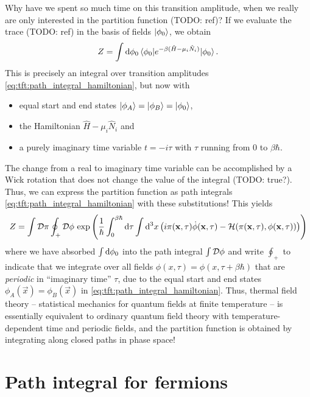 Why have we spent so much time on this transition amplitude, when we really are only interested in the partition function (TODO: ref)?
If we evaluate the trace (TODO: ref) in the basis of fields $\ket{\phi_0}$, we obtain
\begin{equation}
	Z = \int \mathop{}\!\mathrm{d} \phi_0 \braket{\phi_0 | e^{-\beta (\hat{H} - \mu_i \hat{N}_i)} | \phi_0} .
\end{equation}
This is precisely an integral over transition amplitudes \eqref{eq:tft:path_integral_hamiltonian}, but now with 
\begin{itemize}
\item equal start and end states $\ket{\phi_A} = \ket{\phi_B} = \ket{\phi_0}$, 
\item the Hamiltonian $\hat{H} - \mu_i \hat{N}_i$ and 
\item a purely imaginary time variable $t = -i \tau$ with $\tau$ running from $0$ to $\beta \hbar$.
\end{itemize}
The change from a real to imaginary time variable can be accomplished by a Wick rotation that does not change the value of the integral (TODO: true?).
Thus, we can express the partition function as path integrals \eqref{eq:tft:path_integral_hamiltonian} with these substitutions!
This yields
\begin{equation}
	Z = \int \mathcal{D} \pi \oint_+ \mathcal{D} \phi \, \exp \left( \frac{1}{\hbar} \int_0^{\beta \hbar} \mathop{}\!\mathrm{d} \tau \int \mathop{}\!\mathrm{d}^3 x \left( i \pi(\mathbf{x}, \tau) \dot{\phi}(\mathbf{x}, \tau) - \mathcal{H}(\pi(\mathbf{x}, \tau), \phi(\mathbf{x}, \tau)) \right) \right)
\label{eq:tft:partition_function}
\end{equation}
where we have absorbed $\int \mathop{}\!\mathrm{d} \phi_0$ into the path integral $\int \mathcal{D} \phi$ and write $\oint_+$ to indicate that we integrate over all fields $\phi(x, \tau) = \phi(x, \tau + \beta \hbar)$ that are \emph{periodic} in ``imaginary time'' $\tau$, due to the equal start and end states $\phi_A(\vec{x}) = \phi_B(\vec{x})$ in \cref{eq:tft:path_integral_hamiltonian}.
Thus, thermal field theory -- statistical mechanics for quantum fields at finite temperature -- is essentially equivalent to ordinary quantum field theory with temperature-dependent time and periodic fields, and the partition function is obtained by integrating along closed paths in phase space!

\section{Path integral for fermions}

